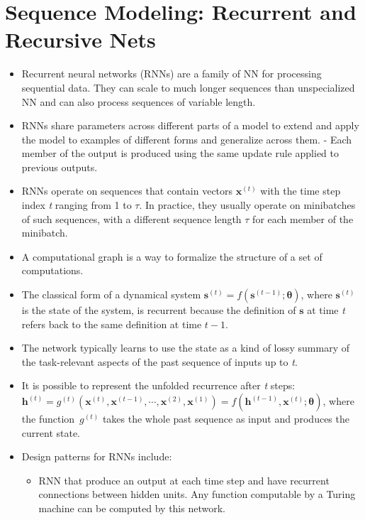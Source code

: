 \documentclass{article}
\begin{document}
\section{Sequence Modeling: Recurrent and Recursive Nets}
\begin{itemize}
\item Recurrent neural networks (RNNs) are a family of NN for processing sequential data. They can scale to much longer sequences than unspecialized NN and can also process sequences of variable length.
\item RNNs share parameters across different parts of a model to extend and apply the model to examples of different forms and generalize across them. - Each member of the output is produced using the same update rule applied to previous outputs.
\item RNNs operate on sequences that contain vectors \(\boldsymbol{x}^{(t)}\) with the time step index \textit{t} ranging from 1 to \(\tau\). In practice, they usually operate on minibatches of such sequences, with a different sequence length \(\tau\) for each member of the minibatch.
\item A computational graph is a way to formalize the structure of a set of computations.
\item The classical form of a dynamical system \(\boldsymbol{s}^{(t)} = f(\boldsymbol{s}^{(t-1)}; \boldsymbol{\theta})\), where \(\boldsymbol{s}^{(t)}\) is the state of the system, is recurrent because the definition of \(\boldsymbol{s}\) at time \textit{t} refers back to the same definition at time \(t - 1\).
\item The network typically learns to use the state as a kind of lossy summary of the task-relevant aspects of the past sequence of inputs up to \textit{t}.
\item It is possible to represent the unfolded recurrence after \textit{t} steps: \(\boldsymbol{h}^{(t)} = g^{(t)}(\boldsymbol{x}^{(t)}, \boldsymbol{x}^{(t-1)},\cdots, \boldsymbol{x}^{(2)}, \boldsymbol{x}^{(1)}) = f(\boldsymbol{h}^{(t-1)}, \boldsymbol{x}^{(t)}; \boldsymbol{\theta})\), where the function \(g^{(t)}\) takes the whole past sequence as input and produces the current state.
\item Design patterns for RNNs include:
\begin{itemize}
\item RNN that produce an output at each time step and have recurrent connections between hidden units. Any function computable by a Turing machine can be computed by this network.\\

\end{itemize}
\end{itemize}
\end{document}
